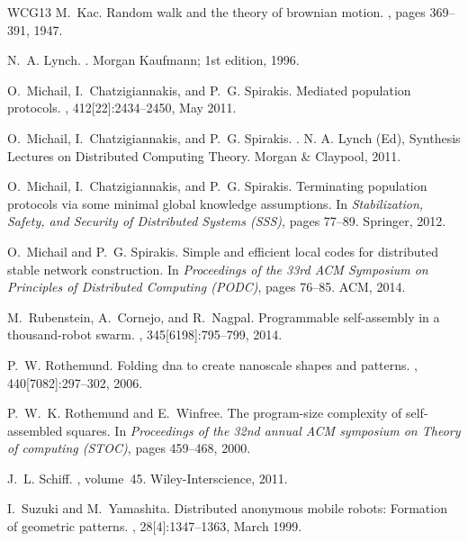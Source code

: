 \documentclass[oribibl, 11pt]{llncs}
\begin{document}
\begin{thebibliography}{WCG{\etalchar{+}}13}
M.~Kac.
\newblock Random walk and the theory of brownian motion.
, pages 369--391, 1947.

N.~A. Lynch.
.
\newblock Morgan Kaufmann; 1st edition, 1996.

O.~Michail, I.~Chatzigiannakis, and P.~G. Spirakis.
\newblock Mediated population protocols.
, 412[22]:2434--2450, May 2011.

O.~Michail, I.~Chatzigiannakis, and P.~G. Spirakis.
.
\newblock N. A. Lynch (Ed), Synthesis Lectures on Distributed Computing Theory.
  Morgan \& Claypool, 2011.

O.~Michail, I.~Chatzigiannakis, and P.~G. Spirakis.
\newblock Terminating population protocols via some minimal global knowledge
  assumptions.
\newblock In {\em Stabilization, Safety, and Security of Distributed Systems
  (SSS)}, pages 77--89. Springer, 2012.

O.~Michail and P.~G. Spirakis.
\newblock Simple and efficient local codes for distributed stable network
  construction.
\newblock In {\em Proceedings of the 33rd ACM Symposium on Principles of
  Distributed Computing (PODC)}, pages 76--85. ACM, 2014.

M.~Rubenstein, A.~Cornejo, and R.~Nagpal.
\newblock Programmable self-assembly in a thousand-robot swarm.
, 345[6198]:795--799, 2014.

P.~W. Rothemund.
\newblock Folding dna to create nanoscale shapes and patterns.
, 440[7082]:297--302, 2006.

P.~W.~K. Rothemund and E.~Winfree.
\newblock The program-size complexity of self-assembled squares.
\newblock In {\em Proceedings of the 32nd annual ACM symposium on Theory of
  computing (STOC)}, pages 459--468, 2000.

J.~L. Schiff.
, volume~45.
\newblock Wiley-Interscience, 2011.

I.~Suzuki and M.~Yamashita.
\newblock Distributed anonymous mobile robots: Formation of geometric patterns.
, 28[4]:1347--1363, March 1999.


\end{thebibliography}
\end{document}
